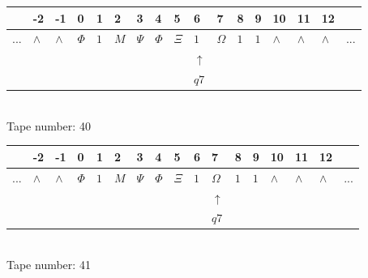 \documentclass[11pt]{article}
\begin{document}
\begin{table}[H]
\centering
\begin{tabular}{lllllllllllllllll}
 & -2 & -1 & 0 & 1 & 2 & 3 & 4 & 5 & 6 & 7 & 8 & 9 & 10 & 11 & 12 & \\
\hline
$...$ & \multicolumn{1}{|l|}{$\wedge$} & \multicolumn{1}{|l|}{$\wedge$} & \multicolumn{1}{|l|}{$\Phi$} & \multicolumn{1}{|l|}{$1$} & \multicolumn{1}{|l|}{$M$} & \multicolumn{1}{|l|}{$\Psi$} & \multicolumn{1}{|l|}{$\Phi$} & \multicolumn{1}{|l|}{$\Xi$} & \multicolumn{1}{|l|}{$1$} & \multicolumn{1}{|l|}{$\Omega$} & \multicolumn{1}{|l|}{$1$} & \multicolumn{1}{|l|}{$1$} & \multicolumn{1}{|l|}{$\wedge$} & \multicolumn{1}{|l|}{$\wedge$} & \multicolumn{1}{|l|}{$\wedge$} & $...$\\
\hline
&  &  &  &  &  &  &  &  & $\uparrow$ &  &  &  &  &  &  &  \\
&  &  &  &  &  &  &  &  & $ q7 $ &  &  &  &  &  &  &  \\
\end{tabular}
\\
Tape number: 40
\noindent\makebox[\linewidth]{\hdashrule{\textwidth}{1pt}{1pt}}\end{table}

\begin{table}[H]
\centering
\begin{tabular}{lllllllllllllllll}
 & -2 & -1 & 0 & 1 & 2 & 3 & 4 & 5 & 6 & 7 & 8 & 9 & 10 & 11 & 12 & \\
\hline
$...$ & \multicolumn{1}{|l|}{$\wedge$} & \multicolumn{1}{|l|}{$\wedge$} & \multicolumn{1}{|l|}{$\Phi$} & \multicolumn{1}{|l|}{$1$} & \multicolumn{1}{|l|}{$M$} & \multicolumn{1}{|l|}{$\Psi$} & \multicolumn{1}{|l|}{$\Phi$} & \multicolumn{1}{|l|}{$\Xi$} & \multicolumn{1}{|l|}{$1$} & \multicolumn{1}{|l|}{$\Omega$} & \multicolumn{1}{|l|}{$1$} & \multicolumn{1}{|l|}{$1$} & \multicolumn{1}{|l|}{$\wedge$} & \multicolumn{1}{|l|}{$\wedge$} & \multicolumn{1}{|l|}{$\wedge$} & $...$\\
\hline
&  &  &  &  &  &  &  &  &  & $\uparrow$ &  &  &  &  &  &  \\
&  &  &  &  &  &  &  &  &  & $ q7 $ &  &  &  &  &  &  \\
\end{tabular}
\\
Tape number: 41
\noindent\makebox[\linewidth]{\hdashrule{\textwidth}{1pt}{1pt}}\end{table}
\clearpage
\end{document}
